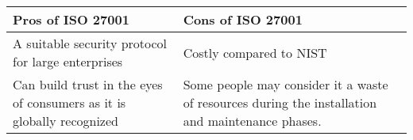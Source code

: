 \begin{table}

          \centering
          \caption{\cite{securityboulevardNISTWhat}}
          \begin{tabular}{|p{8.5cm}|p{8.5cm}|}
          \hline
          \raggedright Pros of ISO 27001 & Cons of ISO 27001 \\ \hline
          A suitable security protocol for large enterprises & Costly compared to NIST \\ \hline
          Can build trust in the eyes of consumers as it is globally recognized & Some people may consider it a waste of resources during the installation and maintenance phases. \\ \hline
          \end{tabular}
          
\end{table}